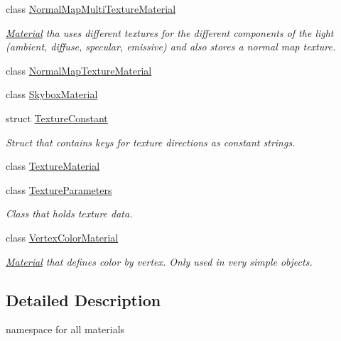 \begin{DoxyCompactItemize}
class \mbox{\hyperlink{class_geometry_engine_1_1_geometry_material_1_1_normal_map_multi_texture_material}{Normal\+Map\+Multi\+Texture\+Material}}
\begin{DoxyCompactList}\small\item\em \mbox{\hyperlink{class_geometry_engine_1_1_geometry_material_1_1_material}{Material}} tha uses different textures for the different components of the light (ambient, diffuse, specular, emissive) and also stores a normal map texture. \end{DoxyCompactList}\item 
class \mbox{\hyperlink{class_geometry_engine_1_1_geometry_material_1_1_normal_map_texture_material}{Normal\+Map\+Texture\+Material}}
\item 
class \mbox{\hyperlink{class_geometry_engine_1_1_geometry_material_1_1_skybox_material}{Skybox\+Material}}
\item 
struct \mbox{\hyperlink{struct_geometry_engine_1_1_geometry_material_1_1_texture_constant}{Texture\+Constant}}
\begin{DoxyCompactList}\small\item\em Struct that contains keys for texture directions as constant strings. \end{DoxyCompactList}\item 
class \mbox{\hyperlink{class_geometry_engine_1_1_geometry_material_1_1_texture_material}{Texture\+Material}}
\item 
class \mbox{\hyperlink{class_geometry_engine_1_1_geometry_material_1_1_texture_parameters}{Texture\+Parameters}}
\begin{DoxyCompactList}\small\item\em Class that holds texture data. \end{DoxyCompactList}\item 
class \mbox{\hyperlink{class_geometry_engine_1_1_geometry_material_1_1_vertex_color_material}{Vertex\+Color\+Material}}
\begin{DoxyCompactList}\small\item\em \mbox{\hyperlink{class_geometry_engine_1_1_geometry_material_1_1_material}{Material}} that defines color by vertex. Only used in very simple objects. \end{DoxyCompactList}\end{DoxyCompactItemize}


\subsection{Detailed Description}
namespace for all materials 